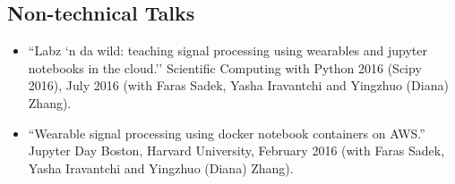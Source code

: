 \begin{itemize}
%
%
\end{itemize}

\subsection*{Non-technical Talks}

\begin{itemize}
    \item ``Labz `n da wild: teaching signal processing using wearables and jupyter notebooks in the cloud.'' Scientific Computing with Python 2016 (Scipy 2016), July 2016 (with Faras Sadek, Yasha Iravantchi and Yingzhuo (Diana) Zhang).
    \item ``Wearable signal processing using docker notebook containers on AWS.'' Jupyter Day Boston, Harvard University, February 2016 (with Faras Sadek, Yasha Iravantchi and Yingzhuo (Diana) Zhang).
\end{itemize}


%
%
%
